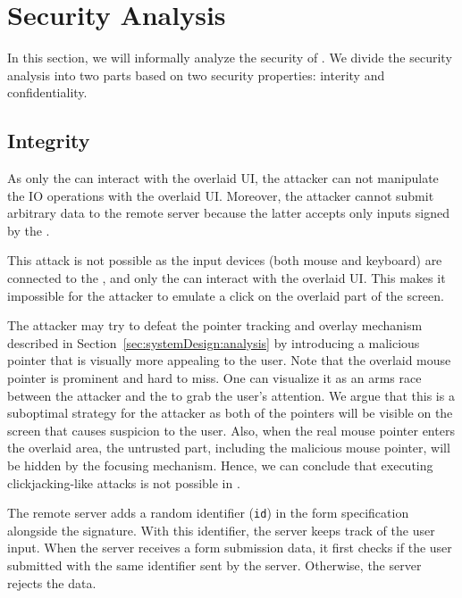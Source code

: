 \section{Security Analysis}
\label{sec:securityAnalysis_protection}

In this section, we will informally analyze the security of \name. We divide the security analysis into two parts based on two security properties: interity and confidentiality.

\subsection{Integrity}
\label{sec:securityAnalysis:integrity}


 As only the \device can interact with the overlaid UI, the attacker can not manipulate the IO operations with the overlaid UI. Moreover, the attacker cannot submit arbitrary data to the remote server because the latter accepts only inputs signed by the \device.


 This attack is not possible as the input devices (both mouse and keyboard) are connected to the \device, and only the \device can interact with the overlaid UI. This makes it impossible for the attacker to emulate a click on the overlaid part of the screen.  


The attacker may try to defeat the \name pointer tracking and overlay mechanism described in Section~\ref{sec:systemDesign:analysis} by introducing a malicious pointer that is visually more appealing to the user. Note that the \device overlaid mouse pointer is prominent and hard to miss. One can visualize it as an arms race between the attacker and the \device to grab the user's attention. We argue that this is a suboptimal strategy for the attacker as both of the pointers will be visible on the screen that causes suspicion to the user. Also, when the real mouse pointer enters the overlaid area, the untrusted part, including the malicious mouse pointer, will be hidden by the focusing mechanism. Hence, we can conclude that executing clickjacking-like attacks is not possible in \name.


 The remote server adds a random identifier (\texttt{id}) in the form specification alongside the signature. With this identifier, the server keeps track of the user input. When the server receives a form submission data, it first checks if the user submitted with the same identifier sent by the server. Otherwise, the server rejects the data. 


